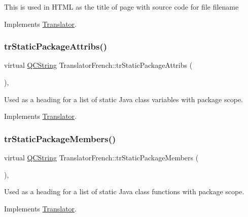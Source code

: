 This is used in H\+T\+ML as the title of page with source code for file filename 

Implements \mbox{\hyperlink{class_translator}{Translator}}.

\mbox{\label{class_translator_french_a0a10653bf04f966e9b363448055ef2da}} 
\subsubsection{\texorpdfstring{trStaticPackageAttribs()}{trStaticPackageAttribs()}}
{\footnotesize\ttfamily virtual \mbox{\hyperlink{class_q_c_string}{Q\+C\+String}} Translator\+French\+::tr\+Static\+Package\+Attribs (\begin{DoxyParamCaption}{ }\end{DoxyParamCaption})\hspace{0.3cm}{\ttfamily [inline]}, {\ttfamily [virtual]}}

Used as a heading for a list of static Java class variables with package scope. 

Implements \mbox{\hyperlink{class_translator}{Translator}}.

\mbox{\label{class_translator_french_a76b684067c4c4550a1ad9612caf6f4cf}} 
\subsubsection{\texorpdfstring{trStaticPackageMembers()}{trStaticPackageMembers()}}
{\footnotesize\ttfamily virtual \mbox{\hyperlink{class_q_c_string}{Q\+C\+String}} Translator\+French\+::tr\+Static\+Package\+Members (\begin{DoxyParamCaption}{ }\end{DoxyParamCaption})\hspace{0.3cm}{\ttfamily [inline]}, {\ttfamily [virtual]}}

Used as a heading for a list of static Java class functions with package scope. 

Implements \mbox{\hyperlink{class_translator}{Translator}}.

